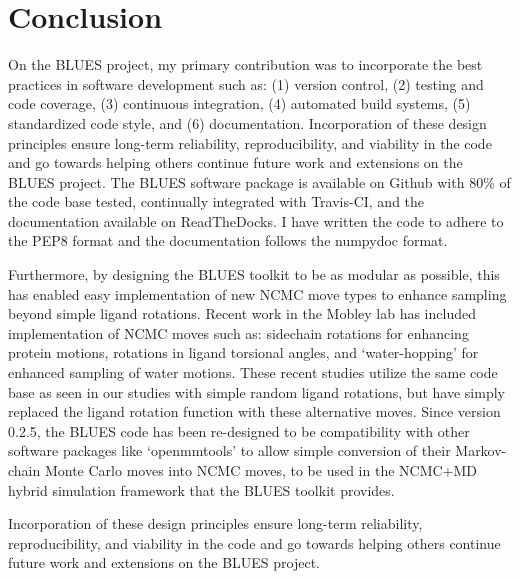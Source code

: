 \section{Conclusion}
On the BLUES project, my primary contribution was to incorporate the best practices in software development such as: (1) version control, (2) testing and code coverage, (3) continuous integration, (4) automated build systems, (5) standardized code style, and (6) documentation.
Incorporation of these design principles ensure long-term reliability, reproducibility, and viability in the code and go towards helping others continue future work and extensions on the BLUES project.
The BLUES software package is available on Github with 80\% of the code base tested, continually integrated with Travis-CI, and the documentation available on ReadTheDocks. 
I have written the code to adhere to the PEP8 format \cite{pep8} and the documentation follows the numpydoc \cite{numpydoc} format.

Furthermore, by designing the BLUES toolkit to be as modular as possible, this has enabled easy implementation of new NCMC move types to enhance sampling beyond simple ligand rotations.
Recent work in the Mobley lab has included implementation of NCMC moves such as: sidechain rotations \cite{burley2019enhancing} for enhancing protein motions, rotations in ligand torsional angles, and `water-hopping' for enhanced sampling of water motions.
These recent studies utilize the same code base as seen in our studies with simple random ligand rotations, but have simply replaced the ligand rotation function with these alternative moves.
Since version 0.2.5, the BLUES code has been re-designed to be compatibility with other software packages like `openmmtools' \cite{openmmtools} to allow simple conversion of their Markov-chain Monte Carlo moves into NCMC moves, to be used in the NCMC+MD hybrid simulation framework that the BLUES toolkit provides.

Incorporation of these design principles ensure long-term reliability, reproducibility, and viability in the code and go towards helping others continue future work and extensions on the BLUES project. 